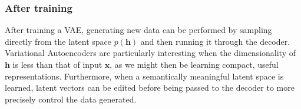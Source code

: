 \documentclass{beamer}
\begin{document}
\begin{frame}
\frametitle{After training}

After training a VAE, generating new data can be performed by sampling
directly from the latent space $p(\bm{h})$ and then running it through
the decoder.  Variational Autoencoders are particularly interesting
when the dimensionality of $\bm{h}$ is less than that of input
$\bm{x}$, as we might then be learning compact, useful
representations.  Furthermore, when a semantically meaningful latent
space is learned, latent vectors can be edited before being passed to
the decoder to more precisely control the data generated.
\end{frame}
\end{document}
